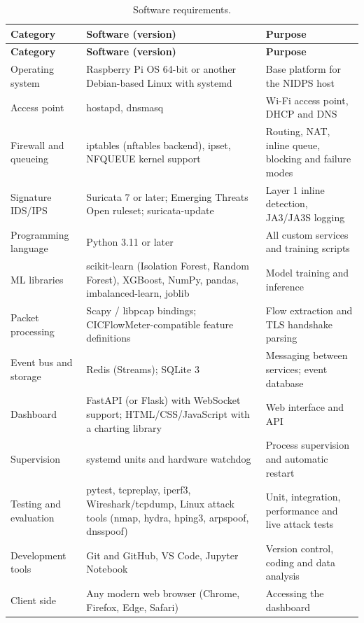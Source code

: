 {\small
\begin{longtable}{|>{\raggedright\arraybackslash}p{}|>{\raggedright\arraybackslash}p{}|>{\raggedright\arraybackslash}p{}|}
\caption{Software requirements.}\label{tab:4.16}\\
\hline
\textbf{Category} & \textbf{Software (version)} & \textbf{Purpose} \\ \hline
\endfirsthead
\hline
\textbf{Category} & \textbf{Software (version)} & \textbf{Purpose} \\ \hline
\endhead
Operating system & Raspberry Pi OS 64-bit or another Debian-based Linux with systemd & Base platform for the NIDPS host \\ \hline
Access point & hostapd, dnsmasq & Wi-Fi access point, DHCP and DNS \\ \hline
Firewall and queueing & iptables (nftables backend), ipset, NFQUEUE kernel support & Routing, NAT, inline queue, blocking and failure modes \\ \hline
Signature IDS/IPS & Suricata 7 or later; Emerging Threats Open ruleset; suricata-update & Layer 1 inline detection, JA3/JA3S logging \\ \hline
Programming language & Python 3.11 or later & All custom services and training scripts \\ \hline
ML libraries & scikit-learn (Isolation Forest, Random Forest), XGBoost, NumPy, pandas, imbalanced-learn, joblib & Model training and inference \\ \hline
Packet processing & Scapy / libpcap bindings; CICFlowMeter-compatible feature definitions & Flow extraction and TLS handshake parsing \\ \hline
Event bus and storage & Redis (Streams); SQLite 3 & Messaging between services; event database \\ \hline
Dashboard & FastAPI (or Flask) with WebSocket support; HTML/CSS/JavaScript with a charting library & Web interface and API \\ \hline
Supervision & systemd units and hardware watchdog & Process supervision and automatic restart \\ \hline
Testing and evaluation & pytest, tcpreplay, iperf3, Wireshark/tcpdump, Linux attack tools (nmap, hydra, hping3, arpspoof, dnsspoof) & Unit, integration, performance and live attack tests \\ \hline
Development tools & Git and GitHub, VS Code, Jupyter Notebook & Version control, coding and data analysis \\ \hline
Client side & Any modern web browser (Chrome, Firefox, Edge, Safari) & Accessing the dashboard \\ \hline
\end{longtable}
}

